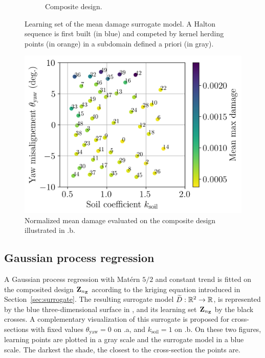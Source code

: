 \begin{figure}
\begin{subfigure}{0.48\linewidth}
        \caption{Composite design.}
    \end{subfigure}
    \caption{Learning set of the mean damage surrogate model. A Halton sequence is first built (in blue) and competed by kernel herding points (in orange) in a subdomain defined a priori (in gray).}
    \label{fig:initial_doe}
\end{figure}

\begin{figure}[h!]
    \centering
    \includegraphics[width=0.6\linewidth]{./part3/figures/OWT/normalized_results_mean.png}
    \caption{Normalized mean damage evaluated on the composite design illustrated in .b.}
    \label{fig:evaluated_doe}
\end{figure}


\subsection{Gaussian process regression}

A Gaussian process regression with Matérn $5/2$ and constant trend is fitted on the composited design ${\bf Z}_{n_{\bf Z}}$ according to the kriging equation introduced in Section~\ref{sec:surrogate}. 
The resulting surrogate model $\widetilde{D}:\mathbb{R}^2 \rightarrow \mathbb{R}$, is represented by the blue three-dimensional surface in , and its learning set  ${\bf Z}_{n_{\bf Z}}$ by the black crosses.  
A complementary visualization of this surrogate is proposed for cross-sections with fixed values $\theta_{\mathrm{yaw}}=0$ on .a, and $k_{\mathrm{soil}}=1$ on .b. 
On these two figures, learning points are plotted in a gray scale and the surrogate model in a blue scale. 
The darkest the shade, the closest to the cross-section the points are. 

